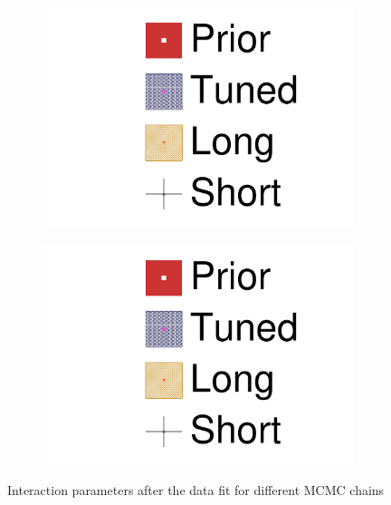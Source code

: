 \begin{figure}[h]
	\begin{subfigure}[t]{0.49\textwidth}
		\includegraphics[width=\textwidth, trim={0mm 0mm 0mm 0mm}, clip,page=20]{figures/mach3/data/2017b_NewData_NewDet_UpdXsecStep_2Xsec_4Det_5Flux_0_2017b_June_NewDet_merge_2017b_NewDet_June_Long_0}
	\end{subfigure}
	\begin{subfigure}[t]{0.49\textwidth}
		\includegraphics[width=\textwidth, trim={0mm 0mm 0mm 0mm}, clip,page=21]{figures/mach3/data/2017b_NewData_NewDet_UpdXsecStep_2Xsec_4Det_5Flux_0_2017b_June_NewDet_merge_2017b_NewDet_June_Long_0}
	\end{subfigure}
	\caption{Interaction parameters after the data fit for different MCMC chains}
	\label{fig:xsec_data}
\end{figure}

